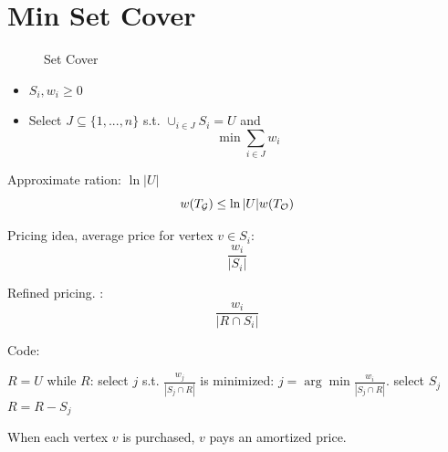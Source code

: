 \documentclass[a4paper]{report}
\theoremstyle{definition}
\begin{document}
\section{Min Set Cover}
\begin{figure}[!htp]
\centering
{}
\caption{Set Cover}
\label{fig:setCover}
\end{figure}
\begin{itemize}
\item $S_i, w_i\geq 0$
\item Select $J \subseteq \{1, ..., n\}$ s.t.  $\cup_{i\in J} S_i = U$ and 
$$
\min \sum_{i\in J} w_i
$$
\end{itemize}
Approximate ration: $\ln |U|$
$$
w(T_{\mathcal{G}}) \leq \ln |U| w(T_{\mathcal{O}})
$$

Pricing idea, average price for vertex $v \in S_i$:
$$
\frac{w_i}{|S_i|}
$$

Refined pricing. :
$$
\frac{w_i}{|R\cap S_i|}
$$

Code: 
\begin{python}[mathescape]
$R=U$
while $R$:
  select $j$ s.t. $\frac{w_j}{|S_j\cap R|}$ is minimized: $j=\arg\min \frac{w_i}{|S_j\cap R|}$. 
  select $S_j$ 
  $R=R-S_j$
\end{python}

When each vertex $v$ is purchased, $v$ pays an amortized price. 
\end{document}
